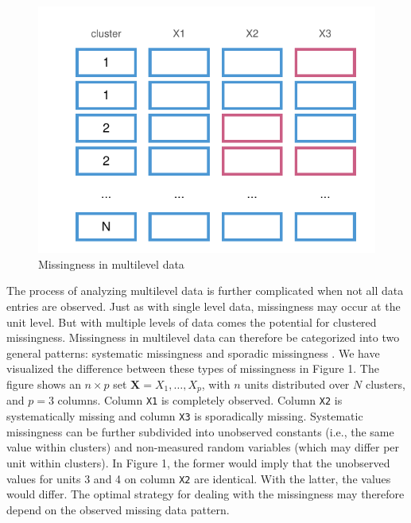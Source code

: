 \documentclass[
]{jss}
\begin{document}
\begin{CodeChunk}
\begin{figure}

{\centering \includegraphics{Manuscript_files/figure-latex/patterns-1} 

}

\caption[Missingness in multilevel data]{Missingness in multilevel data}\label{fig:patterns}
\end{figure}
\end{CodeChunk}

The process of analyzing multilevel data is further complicated when not
all data entries are observed. Just as with single level data,
missingness may occur at the unit level. But with multiple levels of
data comes the potential for clustered missingness. Missingness in
multilevel data can therefore be categorized into two general patterns:
systematic missingness and sporadic missingness \citep{resc13}. We have
visualized the difference between these types of missingness in Figure
1. The figure shows an \(n \times p\) set
\(\mathbf{X} = X_1, \dots, X_p\), with \(n\) units distributed over
\(N\) clusters, and \(p=3\) columns. Column \texttt{X1} is completely
observed. Column \texttt{X2} is systematically missing and column
\texttt{X3} is sporadically missing. Systematic missingness can be
further subdivided into unobserved constants (i.e., the same value
within clusters) and non-measured random variables (which may differ per
unit within clusters). In Figure 1, the former would imply that the
unobserved values for units 3 and 4 on column \texttt{X2} are identical.
With the latter, the values would differ. The optimal strategy for
dealing with the missingness may therefore depend on the observed
missing data pattern.
\end{document}
